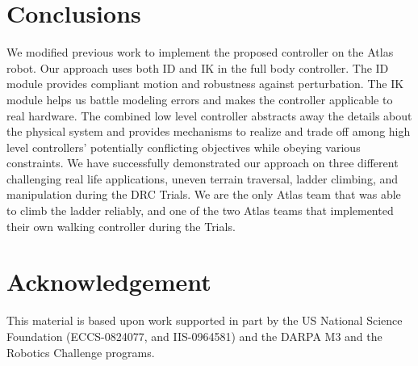 \documentclass{ws-ijhr}
\begin{document}

\section{Conclusions}
We modified previous work to implement the proposed controller on the Atlas 
robot. Our approach uses both ID and IK in the full body controller. The ID 
module provides compliant motion and robustness against perturbation. 
The IK module helps us battle modeling errors and makes the controller 
applicable to real hardware. The combined low level controller 
abstracts away the details about the physical system and provides mechanisms to 
realize and trade off among high level controllers' potentially conflicting 
objectives while obeying various constraints. We have successfully demonstrated 
our approach on three different challenging real life applications, uneven 
terrain traversal, ladder climbing, and manipulation during the DRC Trials. 
We are the only Atlas team that was able to climb the ladder reliably, and one 
of the two Atlas teams that implemented their own walking controller during the
Trials.
 

\section*{Acknowledgement}
This material is based upon work supported in part by the US National Science 
Foundation (ECCS-0824077, and IIS-0964581) and the DARPA M3 and the Robotics 
Challenge programs.
 



\end{document}
